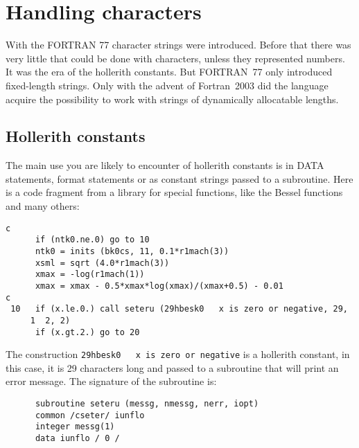 \section{Handling characters}
With the FORTRAN 77 character strings were introduced. Before that there was very little
that could be done with characters, unless they represented numbers. It was the era
of the hollerith constants. But FORTRAN~77 only introduced fixed-length strings.
Only with the advent of Fortran~2003 did the language acquire the possibility to
work with strings of dynamically allocatable lengths.


\subsection{Hollerith constants}
The main use you are likely to encounter of hollerith constants is in DATA statements, format statements or
as constant strings passed to a subroutine. Here is
a code fragment from a library for special functions, like the Bessel functions and
many others:
\begin{verbatim}
c
      if (ntk0.ne.0) go to 10
      ntk0 = inits (bk0cs, 11, 0.1*r1mach(3))
      xsml = sqrt (4.0*r1mach(3))
      xmax = -log(r1mach(1))
      xmax = xmax - 0.5*xmax*log(xmax)/(xmax+0.5) - 0.01
c
 10   if (x.le.0.) call seteru (29hbesk0   x is zero or negative, 29,
     1  2, 2)
      if (x.gt.2.) go to 20
\end{verbatim}

The construction \verb+29hbesk0   x is zero or negative+ is a hollerith constant, in
this case, it is 29 characters long and passed to a subroutine that will print an
error message. The signature of the subroutine is:
\begin{verbatim}
      subroutine seteru (messg, nmessg, nerr, iopt)
      common /cseter/ iunflo
      integer messg(1)
      data iunflo / 0 /
\end{verbatim}

